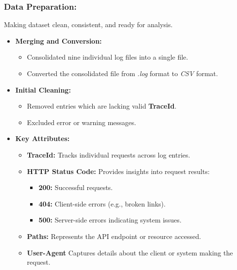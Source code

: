 \documentclass[10pt, a4paper]{beamer}
\begin{document}
	\begin{frame}
		\frametitle{Data Preparation:} 
		Making dataset clean, consistent, and ready for analysis.
		\begin{block}{}
			\begin{itemize}
				\item \textbf{Merging and Conversion:}
				\begin{itemize}
					\item Consolidated nine individual log files into a single file.
					\item Converted the consolidated file from \textit{.log} format to \textit{CSV} format.
				\end{itemize}
				\item \textbf{Initial Cleaning:}
				\begin{itemize}
					\item Removed entries which are lacking valid \textbf{TraceId}.
					\item Excluded error or warning messages.
				\end{itemize}
				\item \textbf{Key Attributes:}
				\begin{itemize}
					\item \textbf{TraceId:} Tracks individual requests across log entries.
					\item \textbf{HTTP Status Code:} Provides insights into request results:
					\begin{itemize}
						\item \textbf{200:} Successful requests.
						\item \textbf{404:} Client-side errors (e.g., broken links).
						\item \textbf{500:} Server-side errors indicating system issues.
					\end{itemize}
					\item \textbf{Paths:} Represents the API endpoint or resource accessed.
					\item \textbf{User-Agent} Captures details about the client or system making the request.
				\end{itemize}
			\end{itemize}
		\end{block}
	\end{frame}
	
\end{document}
